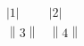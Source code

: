 \[
\begin{array}{cc}
  \left|1\right| & \left| 2 \right| \\
  \left\| 3 \right\| & \left\|4\right\|
  \end{array}
\]%

